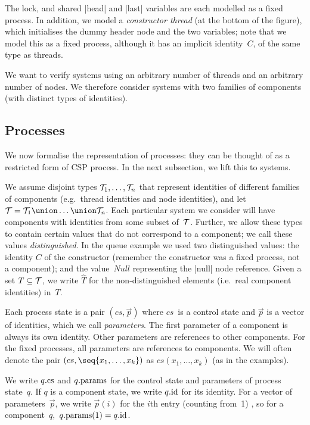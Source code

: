 The lock, and shared |head| and |last| variables are each modelled as a fixed
process.  In addition, we model a \emph{constructor thread} (at the bottom of
the figure), which initialises the dummy header node and the two variables;
note that we model this as a fixed process, although it has an implicit
identity~$C$, of the same type as threads.

We want to verify systems using an arbitrary number of threads and an
arbitrary number of nodes.  We therefore consider systems with two families of
components (with distinct types of identities). 




\subsection{Processes}

We now formalise the representation of processes: they can be thought of as a
restricted form of CSP process.  In the next subsection, we lift this to
systems.

We assume disjoint types $\mathcal{T}_1, \ldots, \mathcal{T}_n$ that represent identities of
different families of components (e.g.~thread identities and node
identities), and let $\T = \T_1 \union \ldots \union \T_n$.  Each particular
system we consider will have components with identities from some subset
of~$\mathcal{T}$. 
Further, we allow these types to contain certain values that do not correspond
to a component; we call these values \emph{distinguished}.  In the queue
example we used two distinguished values: the identity $C$ of the constructor
(remember the constructor was a fixed process, not a component); and the
value~$Null$ representing the |null| node reference.  Given a set
$T \subseteq \mathcal{T}$, we write $\hat{T}$ for the non-distinguished elements
(i.e.~real component identities) in~$T$. 

Each process state is a pair $(cs, \vec p)$ where $cs$~is a control state and
$\vec p$ is a vector of identities, which we call \emph{parameters}.  The
first parameter of a component is always its own identity.  Other parameters
are references to other components.  For the fixed processes, all parameters
are references to components.  We will often denote the pair
$(cs, \seq{x_1,\ldots,x_k})$ as $cs(x_1,\ldots,x_k)$ (as in the examples).

We write $q.\mathrm{cs}$ and $q.\mathrm{params}$ for the control state and parameters of
process state~$q$.  If $q$ is a component state, we write $q.\mathrm{id}$ for its
identity.  For a vector of parameters~$\vec p$, we write $\vec p(i)$ for the
$i$th entry (counting from~1) , so for a component~$q$,\,
$q.\mathrm{params}(1) = q.\mathrm{id}$.

